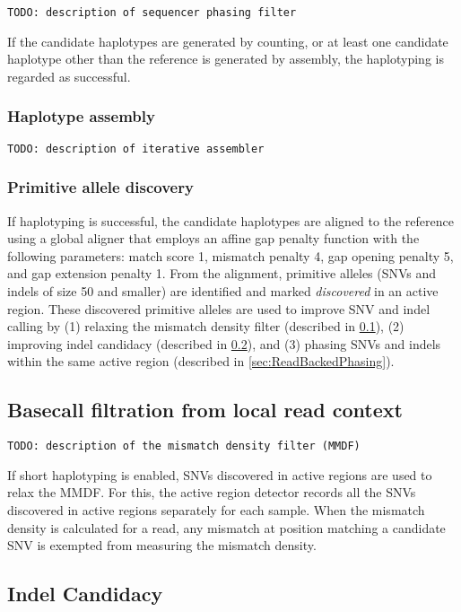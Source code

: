 \documentclass{article}
\begin{document}
{\tt TODO: description of sequencer phasing filter}

If the candidate haplotypes are generated by counting, or at least one candidate haplotype other than the reference is generated by assembly, the haplotyping is regarded as successful.

\subsubsection{Haplotype assembly}
\label{sec:HaplotypeAssembler}
{\tt TODO: description of iterative assembler}

\subsubsection{Primitive allele discovery}
If haplotyping is successful, the candidate haplotypes are aligned to the reference using a global aligner that employs an affine gap penalty function with the following parameters: match score 1, mismatch penalty 4, gap opening penalty 5, and gap extension penalty 1. From the alignment, primitive alleles (SNVs and indels of size 50 and smaller) are identified and marked {\em discovered} in an active region. These discovered primitive alleles are used to improve SNV and indel calling by (1) relaxing the mismatch density filter (described in \ref{sec:BasecallFiltrationFromContext}), (2) improving indel candidacy (described in \ref{sec:IndelCandidacy}), and (3) phasing SNVs and indels within the same active region (described in \ref{sec:ReadBackedPhasing}).

\subsection{Basecall filtration from local read context}
\label{sec:BasecallFiltrationFromContext}

{\tt TODO: description of the mismatch density filter (MMDF)}

If short haplotyping is enabled, SNVs discovered in active regions are used to relax the MMDF. For this, the active region detector records all the SNVs discovered in active regions separately for each sample. When the mismatch density is calculated for a read, any mismatch at position matching a candidate SNV is exempted from measuring the mismatch density.


\subsection{Indel Candidacy}
\label{sec:IndelCandidacy}
\end{document}
